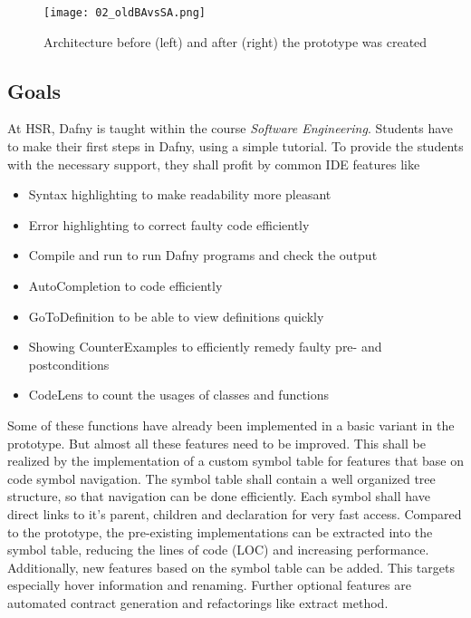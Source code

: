 \begin{figure}[ht]
    \centering
    \texttt{[image: 02\_oldBAvsSA.png]}
    \caption{Architecture before (left) and after (right) the prototype was created}
    \label{fig:oldBAvsSA}
\end{figure}


\subsection{Goals}
At HSR, Dafny is taught within the course \textit{Software Engineering}.
Students have to make their first steps in Dafny, using a simple tutorial.
To provide the students with the necessary support, they shall profit by common IDE features like
\begin{itemize}
    \item Syntax highlighting to make readability more pleasant
    \item Error highlighting to correct faulty code efficiently
    \item Compile and run to run Dafny programs and check the output
    \item AutoCompletion to code efficiently
    \item GoToDefinition to be able to view definitions quickly
    \item Showing CounterExamples to efficiently remedy faulty pre- and postconditions
    \item CodeLens to count the usages of classes and functions
\end{itemize}

Some of these functions have already been implemented in a basic variant in the prototype.
But almost all these features need to be improved.
This shall be realized by the implementation of a custom symbol table for features that base on code symbol navigation.
The symbol table shall contain a well organized tree structure, so that navigation can be done efficiently.
Each symbol shall have direct links to it's parent, children and declaration for very fast access.
Compared to the prototype, the pre-existing implementations can be extracted into the symbol table,
reducing the lines of code (LOC) and increasing performance. \\

Additionally, new features based on the symbol table can be added.
This targets especially hover information and renaming.
Further optional features are automated contract generation and refactorings like extract method. \\

